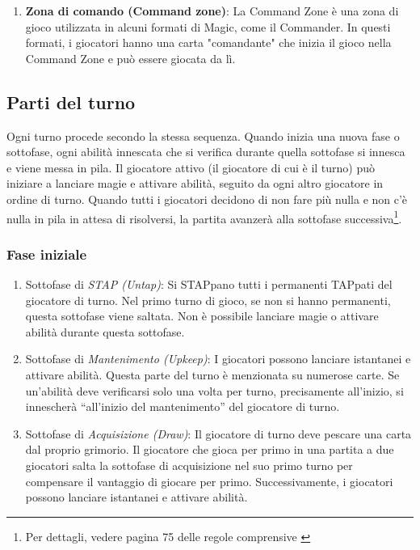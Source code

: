 \begin{enumerate}[label=\alph*.]
    \item \textbf{Zona di comando (Command zone)}: La Command Zone è una zona di gioco utilizzata in alcuni formati di Magic, come il Commander. In questi formati, i giocatori hanno una carta "comandante" che inizia il gioco nella Command Zone e può essere giocata da lì.
\end{enumerate}

\subsection{Parti del turno}\label{subsec:mtg_turns}

Ogni turno procede secondo la stessa sequenza. Quando inizia una nuova fase o sottofase, ogni abilità innescata che si verifica durante quella sottofase si innesca e viene messa in pila. Il giocatore attivo (il giocatore di cui è il turno) può iniziare a lanciare magie e attivare abilità, seguito da ogni altro giocatore in ordine di turno. Quando tutti i giocatori decidono di non fare più nulla e non c'è nulla in pila in attesa di risolversi, la partita avanzerà alla sottofase successiva\footnote{ Per dettagli, vedere pagina 75 delle regole comprensive \cite{mtg-comp-rules}}.

\subsubsection{Fase iniziale} 
\begin{enumerate}[label=\alph*.] 
\item Sottofase di \emph{STAP (Untap)}: Si STAPpano tutti i permanenti TAPpati del giocatore di turno. Nel primo turno di gioco, se non si hanno permanenti, questa sottofase viene saltata. Non è possibile lanciare magie o attivare abilità durante questa sottofase. 
\item Sottofase di \emph{Mantenimento (Upkeep)}: I giocatori possono lanciare istantanei e attivare abilità. Questa parte del turno è menzionata su numerose carte. Se un'abilità deve verificarsi solo una volta per turno, precisamente all'inizio, si innescherà “all'inizio del mantenimento” del giocatore di turno. 
\item Sottofase di \emph{Acquisizione (Draw)}: Il giocatore di turno deve pescare una carta dal proprio grimorio. Il giocatore che gioca per primo in una partita a due giocatori salta la sottofase di acquisizione nel suo primo turno per compensare il vantaggio di giocare per primo. Successivamente, i giocatori possono lanciare istantanei e attivare abilità. 
\end{enumerate}

